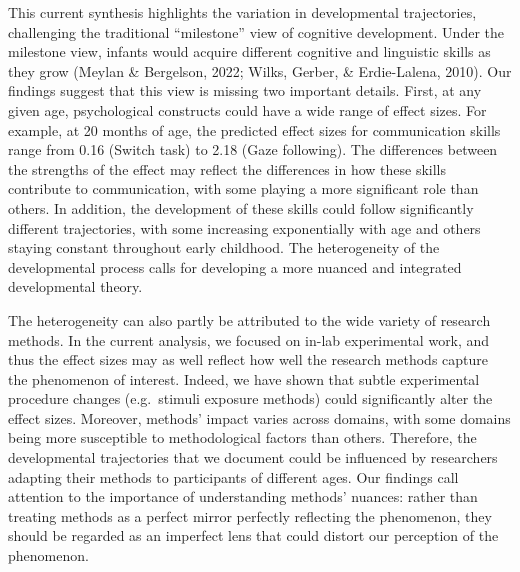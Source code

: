 \documentclass[10pt, letterpaper]{article}
\begin{document}
This current synthesis highlights the variation in developmental
trajectories, challenging the traditional ``milestone'' view of
cognitive development. Under the milestone view, infants would acquire
different cognitive and linguistic skills as they grow (Meylan \&
Bergelson, 2022; Wilks, Gerber, \& Erdie-Lalena, 2010). Our findings
suggest that this view is missing two important details. First, at any
given age, psychological constructs could have a wide range of effect
sizes. For example, at 20 months of age, the predicted effect sizes for
communication skills range from 0.16 (Switch task) to 2.18 (Gaze
following). The differences between the strengths of the effect may
reflect the differences in how these skills contribute to communication,
with some playing a more significant role than others. In addition, the
development of these skills could follow significantly different
trajectories, with some increasing exponentially with age and others
staying constant throughout early childhood. The heterogeneity of the
developmental process calls for developing a more nuanced and integrated
developmental theory.

The heterogeneity can also partly be attributed to the wide variety of
research methods. In the current analysis, we focused on in-lab
experimental work, and thus the effect sizes may as well reflect how
well the research methods capture the phenomenon of interest. Indeed, we
have shown that subtle experimental procedure changes (e.g.~stimuli
exposure methods) could significantly alter the effect sizes. Moreover,
methods' impact varies across domains, with some domains being more
susceptible to methodological factors than others. Therefore, the
developmental trajectories that we document could be influenced by
researchers adapting their methods to participants of different ages.
Our findings call attention to the importance of understanding methods'
nuances: rather than treating methods as a perfect mirror perfectly
reflecting the phenomenon, they should be regarded as an imperfect lens
that could distort our perception of the phenomenon.
\end{document}
